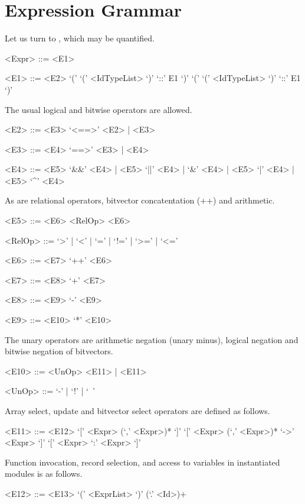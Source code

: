 \section{Expression Grammar}
Let us turn to , which may be quantified. 
\begin{grammar}
    <Expr> ::= <E1>

    <E1> ::= <E2>
         \alt `('  `(' <IdTypeList> `)' `::' E1 `)'
         \alt `('  `(' <IdTypeList> `)' `::' E1 `)'

\end{grammar}

The usual logical and bitwise operators are allowed.
\begin{grammar}
    <E2> ::= <E3> `<==>' <E2> | <E3>

    <E3> ::= <E4> `==>' <E3> | <E4>

    <E4> ::=  <E5> `&&' <E4> | <E5> `||' <E4> | 
          `&' <E4> | <E5> `|' <E4> | <E5> `^' <E4> 
\end{grammar}

As are relational operators, bitvector concatentation (++) and arithmetic.

\begin{grammar}
<E5> ::=  <E6> <RelOp> <E6> 

<RelOp> ::= `>' | `<' | `=' | `!=' | `>=' | `<='

<E6> ::=  <E7> `++' <E6> 

<E7> ::=  <E8> `+' <E7>

<E8> ::=  <E9> `-' <E9>

<E9> ::= <E10> `*' <E10>
\end{grammar}

The unary operators are arithmetic negation (unary minus), logical negation and bitwise negation of bitvectors.
\begin{grammar}
    <E10> ::= <UnOp> <E11> | <E11>

    <UnOp> ::= `-' | `!' | `~'
\end{grammar}

Array select, update and bitvector select operators are defined as follows.
\begin{grammar}
    <E11> ::= <E12> `[' <Expr> (`,' <Expr>)* `]'
           `[' <Expr> (`,' <Expr>)* `->' <Expr> `]'
           `[' <Expr> `:' <Expr> `]'
\end{grammar}

Function invocation, record selection, and access to variables in instantiated modules is as follows.
\begin{grammar}
    <E12> ::=  <E13> `(' <ExprList> `)'
           (`.' <Id>)+
\end{grammar}

